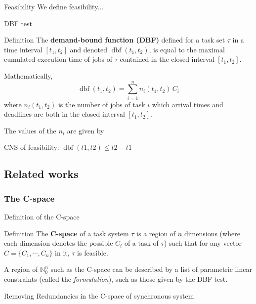 \documentclass{beamer}
\newcommand{\dbf}[1]{\operatorname{dbf}(#1)}
\begin{document}
	\begin{frame}{Feasibility}
		We define feasibility...
	\end{frame}

	\begin{frame}{DBF test}
		\begin{block}{Definition}
			The \textbf{demand-bound function (DBF)}
			defined for a task set $\tau$ in a time interval $[t_1, t_2]$ and denoted $\dbf{t_1, t_2}$, is
			equal to the maximal cumulated execution time of jobs of $\tau$ contained in the
			closed interval $[t_1, t_2]$.
		\end{block}

		Mathematically,
		\[
			\dbf{t_1, t_2} = \sum_{i=1}^{n} n_i(t_1, t_2) \, C_i
		\]
		where $n_i(t_1, t_2)$ is the number of jobs of task $i$ which arrival times
		and deadlines are both in the closed interval $[t_1, t_2]$.

		The values of the $n_i$ are given by \cite{baruah1999generalized}

		CNS of feasibility: $\dbf{t1, t2} \leqslant t2 - t1$
	\end{frame}

	\subsection{Related works}

    \subsubsection{The C-space}

    \begin{frame}{Definition of the C-space}
        \begin{block}{Definition}
            The \textbf{C-space} of a task system $\tau$ is a region of $n$ dimensions (where each dimension denotes the possible $C_i$ of a task of $\tau$) such that for any vector $C = \{ C_1, \cdots, C_{n}\}$ in it, $\tau$ is feasible.
        \end{block}

        A region of $\mathbb{N}_0^n$ such as the C-space can be described by a list of parametric linear constraints (called the \emph{formulation}), such as those given by the DBF test.
    \end{frame}

    \begin{frame}{Removing Redundancies in the C-space of synchronous system}



    \end{frame}
\end{document}
